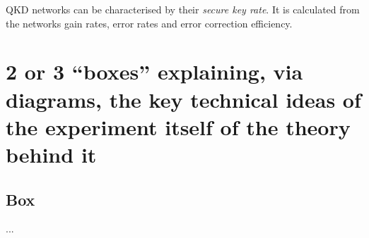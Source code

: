 \documentclass{article}
\begin{document}
QKD networks can be characterised by their \textit{secure key rate}. It is calculated from the networks gain rates, error rates and error correction efficiency. 

\section*{2 or 3 “boxes” explaining, via diagrams, the key technical ideas of the experiment itself of the theory behind it}

\subsection*{Box}
...

   


  
  
\end{document}
